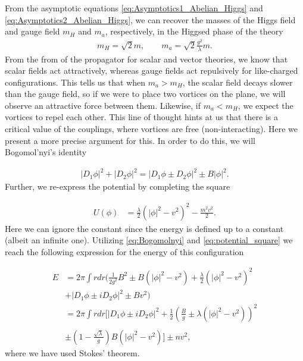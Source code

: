     From the asymptotic equations \eqref{eq:Asymptotics1_Abelian_Higgs} and \eqref{eq:Asymptotics2_Abelian_Higgs}, we can recover the masses of the Higgs field and gauge field $m_{H}$ and $m_a$, respectively, in the Higgsed phase of the theory 
    \begin{align}
        m_{H}= \sqrt{2} m, \qquad m_a = \sqrt{2} \frac{g^2}{\lambda}m .
    \end{align}
    From the from of the propagator for scalar and vector theories, we know that scalar fields act attractively, whereas gauge fields act repulsively for like-charged configurations. This tells us that when $m_a>m_H$, the scalar field decays slower than the gauge field, so if we were to place two vortices on the plane, we will observe an attractive force between them. Likewise, if  $m_a<m_H$, we expect the vortices to repel each other. This line of thought hints at us that there is a critical value of the couplings, where vortices are free (non-interacting). Here we present a more precise argument for this. In order to do this, we will Bogomol'nyi's identity

    \begin{align}
        |D_1 \phi|^2 + |D_2 \phi|^2 = |D_1 \phi \pm D_2 \phi|^2 \pm B |\phi|^2. \label{eq:Bogomolnyi}
    \end{align}
    Further, we re-express the potential by completing the square

    \begin{align}
        U(\phi)&=\frac{\lambda}{2} \left( |\phi|^2 - v^2 \right)^2 - \frac{m^2 v^2}{2}. \label{eq:potential_square}
    \end{align}
    Here we can ignore the constant since the energy is defined up to a constant (albeit an infinite one). Utilizing \eqref{eq:Bogomolnyi} and \eqref{eq:potential_square} we reach the following expression for the energy of this configuration

    \begin{align}
        E &= 2 \pi \int r dr \bigg(\frac{1}{2 g^2}B^2 \pm B(|\phi|^2 -v^2) + \frac{\lambda}{2} \left(|\phi|^2 -v^2 \right)^2 \\ \nonumber 
        &+ |D_1\phi \pm i D_2 \phi|^2 \pm B v^2 \bigg) \\ \nonumber
        &= 2 \pi \int r dr \bigg[|D_1\phi \pm i D_2 \phi|^2 +\frac{1}{2}\left( \frac{B}{g} \pm \lambda \left(|\phi|^2 -v^2  \right) \right)^2   \\ \nonumber \\
        &\pm \left(1 - \frac{\sqrt{\lambda}}{g} \right) B \left(|\phi|^2 - v^2 \right) \bigg] \pm n v^2,
    \end{align}
    where we have used Stokes' theorem.

